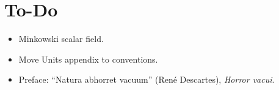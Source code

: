 \section{To-Do}
\begin{itemize}
	\item Minkowski scalar field.
	\item Move Units appendix to conventions.
	\item Preface:	“Natura abhorret vacuum” (René Descartes), \textit{Horror vacui}.
\end{itemize}
